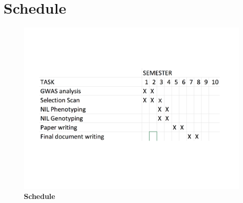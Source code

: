 \documentclass[10pt,letterpaper]{article}
\begin{document}














\nolinenumbers

\clearpage

\section*{Schedule}

\begin{figure}[!h]
   \includegraphics[width=\textwidth]{schedule.png}
   \caption{\textbf{Schedule}}
  \label{figSchedule} 
\end{figure} 




\end{document}
